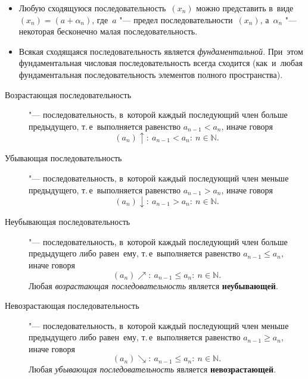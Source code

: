 \documentclass[]{scrartcl}
\begin{document}
{{\begin{itemize}
	\item Любую сходящуюся последовательность~${\textstyle (x_{n})}$ можно представить в~виде~ ${\textstyle (x_{n})=(a+\alpha _{n})}$, где~${\textstyle a}$ "--- предел последовательности~${\textstyle (x_{n})}$, а~${\textstyle \alpha _{n}}$ "--- некоторая бесконечно малая последовательность.
	\item Всякая сходящаяся последовательность является \emph{фундаментальной}. При~этом фундаментальная числовая последовательность всегда сходится (как~и~любая фундаментальная последовательность элементов полного пространства).
\end{itemize}

\begin{description}
	\item[Возрастающая последовательность] "--- последовательность, в~которой каждый последующий член больше предыдущего, т.\,е~выполняется равенство ${\textstyle a_{n-1}<a_n}$, иначе говоря
	\begin{equation}\label{eq:increasing-sequence}
	(a_n)\uparrow:\ a_{n-1}<a_n:\ n \in \mathbb{N}.
	\end{equation}
	\item[Убывающая последовательность] "--- последовательность, в~которой каждый последующий член меньше предыдущего, т.\,е~выполняется равенство ${\textstyle a_{n-1}>a_n}$, иначе говоря
	\begin{equation}\label{eq:decreasing-sequence}
	(a_n)\downarrow:\ a_{n-1}>a_n:\ n \in \mathbb{N}.
	\end{equation}
	\item[Неубывающая последовательность] "--- последовательность, в~которой каждый последующий член больше предыдущего либо равен~ему, т.\,е~выполняется равенство ${\textstyle a_{n-1}\leq a_n}$, иначе говоря
	\begin{equation}\label{eq:non-decreasing-sequence}
	(a_n)\nearrow:\ a_{n-1} \leq a_n:\ n \in \mathbb{N}.
	\end{equation}
	Любая \emph{возрастающая последовательность} является \textbf{неубывающей}.
	\item[Невозрастающая последовательность] "--- последовательность, в~которой каждый последующий член меньше предыдущего либо равен~ему, т.\,е~выполняется равенство ${\textstyle a_{n-1}\geq a_n}$, иначе говоря
	\begin{equation}\label{eq:non-increasing-sequence}
	(a_n)\searrow:\ a_{n-1} \leq a_n:\ n \in \mathbb{N}.
	\end{equation}
	Любая \emph{убывающая последовательность} является \textbf{невозрастающей}.  

\end{description}}}
\end{document}
